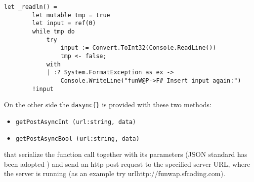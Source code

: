 \begin{lstlisting}[caption=All \fwap \texttt{readln()}'s are compiled into \fsharps \texttt{\_readln()}'s.]
let _readln() =
        let mutable tmp = true
        let input = ref(0)
        while tmp do
            try
                input := Convert.ToInt32(Console.ReadLine())
                tmp <- false;
            with
            | :? System.FormatException as ex ->
                Console.WriteLine("funW@P->F# Insert input again:")
        !input
\end{lstlisting}

On the other side the \texttt{dasync\{\}}  is provided with these two methods:
\begin{itemize}
	\item \texttt{getPostAsyncInt (url:string, data)}
	\item \texttt{getPostAsyncBool (url:string, data)}
\end{itemize}

that serialize the function call together with its parameters (JSON standard has been adopted \cite{json}) and send an http post request to the specified server URL, where the \fwap server is running (as an example try url{http://funwap.sfcoding.com}).
 

